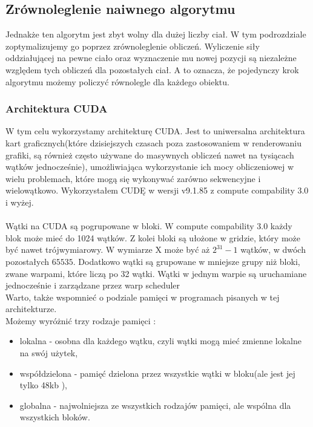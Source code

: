\documentclass[14pt,twoside,a4paper]{article}
\theoremstyle{definition}
\begin{document}
\bigskip

\subsection{\Large Zrównoleglenie naiwnego algorytmu}

Jednakże ten algorytm jest zbyt wolny dla dużej liczby ciał. W tym podrozdziale zoptymalizujemy go poprzez zrównoleglenie obliczeń. Wyliczenie siły oddziałującej na pewne ciało oraz wyznaczenie mu nowej pozycji są niezależne względem tych obliczeń dla pozostałych ciał. A to oznacza, że pojedynczy krok algorytmu możemy policzyć równolegle dla każdego obiektu.

\subsubsection{\large Architektura CUDA}
W tym celu wykorzystamy architekturę CUDA. 
Jest to uniwersalna architektura kart graficznych(które dzisiejszych czasach poza zastosowaniem w renderowaniu grafiki, są również często używane do masywnych obliczeń nawet na tysiącach wątków jednocześnie), umożliwiająca wykorzystanie ich mocy obliczeniowej w wielu problemach, które mogą się wykonywać zarówno sekwencyjne i wielowątkowo. Wykorzystałem CUDĘ w wersji v9.1.85 z compute compability 3.0 i wyżej. \\~\\
Wątki na CUDA są pogrupowane w bloki. W compute compability 3.0 każdy blok może mieć do 1024 wątków. Z kolei bloki są ułożone w gridzie, który może być nawet trójwymiarowy. W wymiarze X może być aż $2^{31}-1$ wątków, w dwóch pozostałych $65535$. \cite[str.~238-242]{Cuda} Dodatkowo wątki są grupowane w mniejsze grupy niż bloki, zwane warpami, które liczą po 32 wątki. Wątki w jednym warpie są uruchamiane jednocześnie i zarządzane przez warp scheduler \cite[str.~70]{Cuda} \\
\bigskip
Warto, także wspomnieć o podziale pamięci w programach pisanych w tej architekturze. \\Możemy wyróżnić trzy rodzaje pamięci :
\begin{itemize}
  \item lokalna - osobna dla każdego wątku, czyli wątki mogą mieć zmienne lokalne na swój użytek,
  \item współdzielona - pamięć dzielona przez wszystkie wątki w bloku(ale jest jej tylko 48kb \cite[str.~238-242]{Cuda}),
  \item globalna - najwolniejsza ze wszystkich rodzajów pamięci, ale wspólna dla wszystkich bloków.
\end{itemize}
\end{document}
